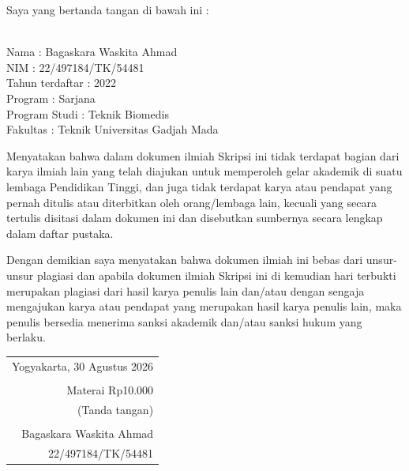 \noindent Saya yang bertanda tangan di bawah ini :

\vspace{-1em}

\begin{tabbing}
\hspace{40mm} \= \\ %
\noindent Nama \> : Bagaskara Waskita Ahmad \\[\parskip]
\noindent NIM \> :  22/497184/TK/54481 \\[\parskip]
\noindent Tahun terdaftar \> :  2022 \\[\parskip]
\noindent Program \> : Sarjana \\[\parskip]
\noindent Program Studi \> :  Teknik Biomedis \\[\parskip]
\noindent Fakultas \> : Teknik Universitas Gadjah Mada
\end{tabbing}

\noindent Menyatakan bahwa dalam dokumen ilmiah Skripsi ini tidak terdapat bagian dari karya ilmiah lain yang telah diajukan untuk memperoleh gelar akademik di suatu lembaga Pendidikan Tinggi, dan juga tidak terdapat karya atau pendapat yang pernah ditulis atau diterbitkan oleh orang/lembaga lain, kecuali yang secara tertulis disitasi dalam dokumen ini dan disebutkan sumbernya secara lengkap dalam daftar pustaka.

\noindent Dengan demikian saya menyatakan bahwa dokumen ilmiah ini bebas dari unsur-unsur plagiasi dan apabila dokumen ilmiah Skripsi ini di kemudian hari terbukti merupakan plagiasi dari hasil karya penulis lain dan/atau dengan sengaja mengajukan karya atau pendapat yang merupakan hasil karya penulis lain, maka penulis bersedia menerima sanksi akademik dan/atau sanksi hukum yang berlaku.


\begin{flushright}
	\begin{tabular}{r}
		Yogyakarta, 30 Agustus 2026 \\
		\vspace{0.1cm} \\
		\tiny{Materai Rp10.000} \\
		\tiny{(Tanda tangan)} \\	
		\vspace{0.1cm} \\
		Bagaskara Waskita Ahmad \\ 22/497184/TK/54481
	\end{tabular}
\end{flushright}